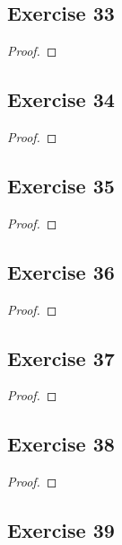 \documentclass[14pt]{extarticle}
\begin{document}
\subsection{Exercise 33}

\begin{proof}

\end{proof}

\subsection{Exercise 34}

\begin{proof}

\end{proof}

\subsection{Exercise 35}

\begin{proof}

\end{proof}

\subsection{Exercise 36}

\begin{proof}

\end{proof}

\subsection{Exercise 37}

\begin{proof}

\end{proof}

\subsection{Exercise 38}

\begin{proof}

\end{proof}

\subsection{Exercise 39}
\end{document}
